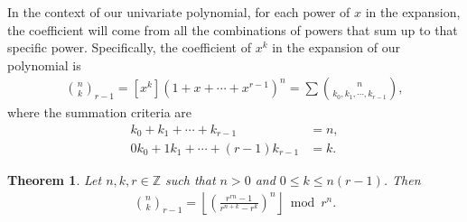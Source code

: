\documentclass{article}
\theoremstyle{plain}
\newtheorem{theorem}{Theorem}[section]
\newcommand{\floor}[1]{\left\lfloor #1 \right\rfloor}
\begin{document}
In the context of our univariate polynomial, for each power of \(x\) in the expansion, the coefficient will come from all the combinations of powers that sum up to that specific power. Specifically, the coefficient of \(x^k\) in the expansion of our polynomial is \cite{brualdi2010intro}
\begin{align*}
    \binom{n}{k}_{r-1} = [x^k](1 + x + \cdots + x^{r-1})^n = \sum \binom{n}{k_0, k_1, \cdots, k_{r-1}} ,
\end{align*}
where the summation criteria are
\begin{align*}
    k_0 + k_1 + \cdots + k_{r-1} &= n , \\
    0 k_0 + 1 k_1 + \cdots + (r-1) k_{r-1} &= k .
\end{align*}

\begin{theorem}
\label{proof:multinomialformula}
Let $n,k,r \in \mathbb{Z}$ such that $n > 0$ and $0 \leq k \leq n (r-1)$. Then
\begin{align*}
    \binom{n}{k}_{r-1} = \floor{\left(\frac{r^{rn} - 1}{r^{n+k} - r^k}\right)^n} \bmod r^n .
\end{align*}
\end{theorem}
\end{document}

